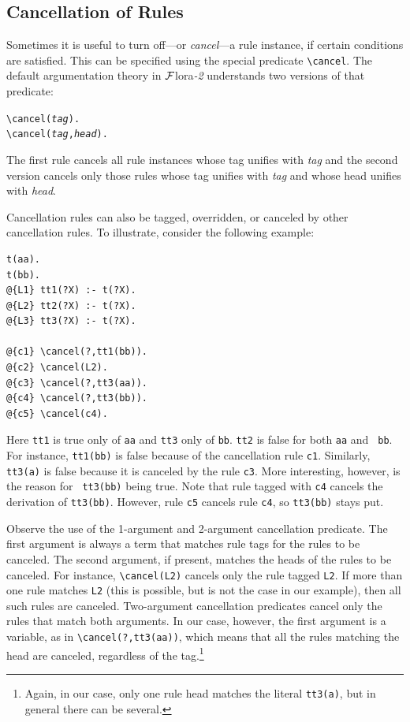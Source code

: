 \documentclass[11pt]{article}
\newcommand{\FLORA}{{\mbox{\sc ${\cal F}${lora}\rm\emph{-2}}}\xspace}
\newcommand{\FLSYSTEM}{\FLORA}
\newcommand{\bs}{\textbackslash}
\begin{document}
\subsection{Cancellation of Rules}\label{sec-cancel}

Sometimes it is useful to turn off---or \emph{cancel}---a rule instance, if
certain conditions are satisfied. This can be specified using the special
predicate {\tt \bs{}cancel}. The default argumentation theory in \FLSYSTEM  
understands two versions of that predicate:
\begin{alltt}
    \bs{}cancel(\textnormal{\textit{tag}}).
    \bs{}cancel(\textnormal{\textit{tag}},\textnormal{\textit{head}}).
\end{alltt}
The first rule cancels all rule instances whose tag unifies with
\emph{tag} and the second version cancels only those rules whose tag
unifies with \emph{tag} and whose head unifies with \emph{head}.   

Cancellation rules can also be tagged, overridden,
or canceled by other cancellation
rules. To illustrate,  consider the following example:
\begin{verbatim}
t(aa).
t(bb).
@{L1} tt1(?X) :- t(?X).
@{L2} tt2(?X) :- t(?X).
@{L3} tt3(?X) :- t(?X).

@{c1} \cancel(?,tt1(bb)).
@{c2} \cancel(L2).
@{c3} \cancel(?,tt3(aa)).
@{c4} \cancel(?,tt3(bb)).
@{c5} \cancel(c4).
\end{verbatim}
Here {\tt tt1} is true only of {\tt aa} and  
{\tt tt3} only of {\tt bb}. {\tt tt2} is false for both {\tt aa} and {\tt
  bb}. For instance, {\tt tt1(bb)} is false because of the cancellation
rule {\tt c1}. Similarly, {\tt tt3(a)} is false because it is canceled by
the rule {\tt c3}.   More interesting, however, is the reason for {\tt
  tt3(bb)} being true. Note that rule tagged with {\tt c4} cancels the
derivation of {\tt tt3(bb)}. However, rule {\tt c5} cancels rule {\tt c4},
so {\tt tt3(bb)} stays put.

Observe the use of the 1-argument and 2-argument cancellation predicate.
The first argument is always a term that matches rule tags for the rules
to be canceled. The second
argument, if present, matches the heads of the rules to be canceled. For
instance, {\tt \bs{}cancel(L2)} cancels only the rule tagged {\tt L2}. If more
than one rule matches {\tt L2} (this is possible, but is not the case in
our example), then all such rules are canceled. Two-argument cancellation
predicates cancel only the rules that match both arguments. In our case,
however, the first argument is a variable, as in {\tt \bs{}cancel(?,tt3(aa))},
which means that all the rules matching the head are canceled, regardless
of the tag.\footnote{
  Again, in our case, only one rule head matches the literal {\tt tt3(a)},
  but in general there can be several.
}
\end{document}
